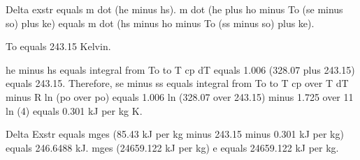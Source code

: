 Delta exstr equals m dot (he minus hs). m dot (he plus ho minus To (se minus so) plus ke) equals m dot (hs minus ho minus To (ss minus so) plus ke).

To equals 243.15 Kelvin.

he minus hs equals integral from To to T cp dT equals 1.006 (328.07 plus 243.15) equals 243.15. Therefore, se minus ss equals integral from To to T cp over T dT minus R ln (po over po) equals 1.006 ln (328.07 over 243.15) minus 1.725 over 11 ln (4) equals 0.301 kJ per kg K.

Delta Exstr equals mges (85.43 kJ per kg minus 243.15 minus 0.301 kJ per kg) equals 246.6488 kJ. mges (24659.122 kJ per kg) e equals 24659.122 kJ per kg.